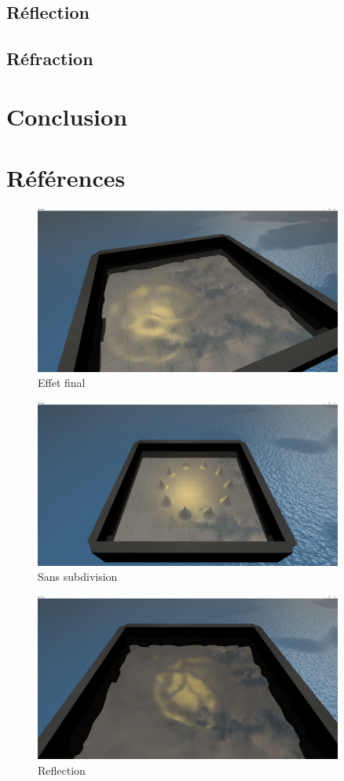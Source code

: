 \documentclass[a4paper, 12pt]{article} %
\begin{document}
\subsection{Réflection}
\subsection{Réfraction}
\section{Conclusion}
\section{Références}
\begin{figure}
	\centering
	\includegraphics[width=0.9\textwidth]{./PhotoRapport/EffetFinal.png}
	\caption{Effet final}
	\label{EffetFinal}
\end{figure}
\begin{figure}
	\centering
	\includegraphics[width=0.9\textwidth]{./PhotoRapport/NoSubdivide.png}
	\caption{Sans subdivision}
	\label{NoSubdivide}
\end{figure}
\begin{figure}
	\centering
	\includegraphics[width=0.9\textwidth]{./PhotoRapport/Reflection.png}
	\caption{Reflection}
	\label{Reflection}
\end{figure}
\end{document}
